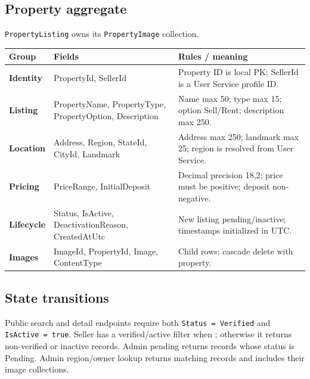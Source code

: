 \documentclass[10pt,a4paper]{article}
\newcommand{\code}[1]{\texttt{\detokenize{#1}}}
\newcommand{\field}[1]{\texttt{#1}}
\begin{document}
\subsection{Property aggregate}
\field{PropertyListing} owns its \field{PropertyImage} collection.
\begin{longtable}{>{\bfseries}p{32mm} p{39mm} p{75mm}}
\toprule
Group & Fields & Rules / meaning\\
\midrule
\endhead
Identity & PropertyId, SellerId & Property ID is local PK; SellerId is a User Service profile ID.\\
Listing & PropertyName, PropertyType, PropertyOption, Description & Name max 50; type max 15; option Sell/Rent; description max 250.\\
Location & Address, Region, StateId, CityId, Landmark & Address max 250; landmark max 25; region is resolved from User Service.\\
Pricing & PriceRange, InitialDeposit & Decimal precision 18,2; price must be positive; deposit non-negative.\\
Lifecycle & Status, IsActive, DeactivationReason, CreatedAtUtc & New listing pending/inactive; timestamps initialized in UTC.\\
Images & ImageId, PropertyId, Image, ContentType & Child rows; cascade delete with property.\\
\bottomrule
\end{longtable}

\subsection{State transitions}
\begin{center}
\end{center}
Public search and detail endpoints require both \field{Status = Verified} and
\field{IsActive = true}. Seller \code{mine} has a verified/active filter when
\code{status=Verified}; otherwise it returns non-verified or inactive records.
Admin pending returns records whose status is Pending. Admin region/owner lookup
returns matching records and includes their image collections.
\end{document}
